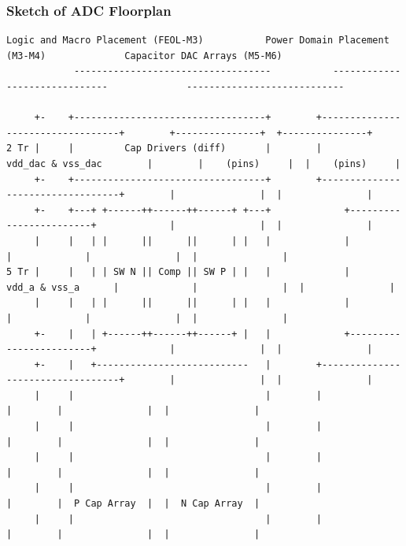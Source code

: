 \begin{frame}[fragile]
  \frametitle{Sketch of ADC Floorplan}
  \begin{center}
  \begin{lstlisting}[basicstyle=\ttfamily\fontsize{4}{5}\selectfont]
            Logic and Macro Placement (FEOL-M3)           Power Domain Placement (M3-M4)              Capacitor DAC Arrays (M5-M6)
            -----------------------------------           ------------------------------              ----------------------------

     +-    +----------------------------------+        +----------------------------------+        +---------------+  +---------------+
2 Tr |     |         Cap Drivers (diff)       |        |         vdd_dac & vss_dac        |        |    (pins)     |  |    (pins)     |
     +-    +----------------------------------+        +----------------------------------+        |               |  |               |
     +-    +---+ +------++------++------+ +---+             +------------------------+             |               |  |               |
     |     |   | |      ||      ||      | |   |             |                        |             |               |  |               |
5 Tr |     |   | | SW N || Comp || SW P | |   |             |     vdd_a & vss_a      |             |               |  |               |
     |     |   | |      ||      ||      | |   |             |                        |             |               |  |               |
     +-    |   | +------++------++------+ |   |             +------------------------+             |               |  |               |
     +-    |   +---------------------------   |        +----------------------------------+        |               |  |               |
     |     |                                  |        |                                  |        |               |  |               |
     |     |                                  |        |                                  |        |               |  |               |
     |     |                                  |        |                                  |        |               |  |               |
     |     |                                  |        |                                  |        |  P Cap Array  |  |  N Cap Array  |
     |     |                                  |        |                                  |        |               |  |               |

\end{lstlisting}
\end{center}
\end{frame}
